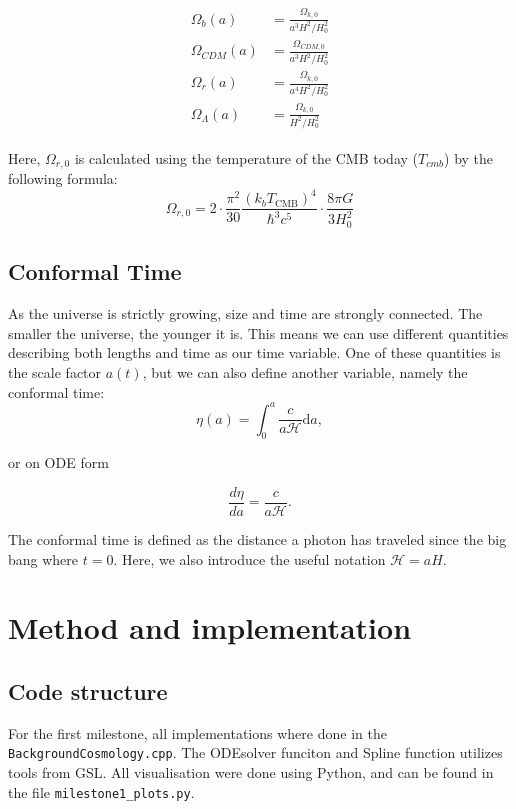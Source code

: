 \documentclass[12pt]{article}
\begin{document}
\begin{align}\label{eq:Density parameters}
    \begin{split}
    \Omega_b(a) &= \frac{\Omega_{k,0}}{a^3 H^2/H_0^2}  \\
    \Omega_{CDM}(a) &= \frac{\Omega_{CDM,0}}{a^3 H^2/H_0^2}  \\
    \Omega_r(a) &= \frac{\Omega_{k,0}}{a^4 H^2/H_0^2}  \\
    \Omega_{\Lambda}(a) &= \frac{\Omega_{k,0}}{H^2/H_0^2} 
    \end{split}
\end{align}

Here, $\Omega_{r,0}$ is calculated using the temperature of the CMB today ($T_{cmb}$) by the following formula: 
\begin{equation}
    \Omega_{r,0} = 2 \cdot \frac{\pi^{2}}{30} \frac{\left(k_{b} T_{\mathrm{CMB}}\right)^{4}}{\hbar^{3} c^{5}} \cdot \frac{8 \pi G}{3 H_{0}^{2}}
\end{equation}

\subsection{Conformal Time}
As the universe is strictly growing, size and time are strongly connected. The smaller the universe, the younger it is. This means we can use different quantities describing both lengths and time as our time variable. One of these quantities is the scale factor $a(t)$, but we can also define another variable, namely the conformal time:
\begin{equation}\label{eq:Conformal time integral}
    \eta(a) = \int_0^a \frac{c}{a\mathcal{H}}\textrm{d}a,
\end{equation}

or on ODE form

\begin{equation}\label{eq:conformal time ode da}
    \frac{d\eta}{da} = \frac{c}{a\mathcal{H}}.
\end{equation}

The conformal time is defined as the distance a photon has traveled since the big bang where $t=0$. Here, we also introduce the useful notation $\mathcal{H} = aH$. 


\section{Method and implementation}
\subsection{Code structure}
For the first milestone, all implementations where done in the \texttt{BackgroundCosmology.cpp}. The ODEsolver funciton and Spline function utilizes tools from GSL. All visualisation were done using Python, and can be found in the file \texttt{milestone1\_plots.py}.
\end{document}
